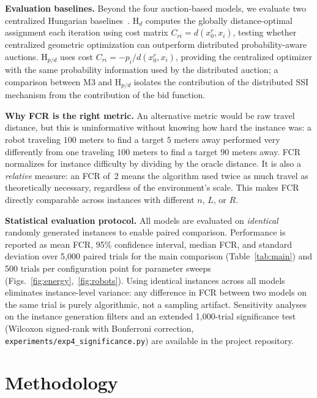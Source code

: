 \documentclass[conference]{IEEEtran}
\begin{document}
\textbf{Evaluation baselines.}
Beyond the four auction-based models, we evaluate two centralized Hungarian
baselines~\cite{Kuhn1955}.
$\mathrm{H}_d$ computes the globally distance-optimal assignment each
iteration using cost matrix $C_{ri} = d(x_0^r, x_i)$, testing whether
centralized geometric optimization can outperform distributed
probability-aware auctions.
$\mathrm{H}_{p/d}$ uses cost $C_{ri} = -p_i/d(x_0^r, x_i)$, providing the
centralized optimizer with the same probability information used by the
distributed auction; a comparison between M3 and $\mathrm{H}_{p/d}$
isolates the contribution of the distributed SSI mechanism from the
contribution of the bid function.

\textbf{Why FCR is the right metric.}
An alternative metric would be raw travel distance, but this is
uninformative without knowing how hard the instance was: a robot traveling
$100$ meters to find a target $5$ meters away performed very differently
from one traveling $100$ meters to find a target $90$ meters away.
FCR normalizes for instance difficulty by dividing by the oracle distance.
It is also a \emph{relative} measure: an FCR of~2 means the algorithm used
twice as much travel as theoretically necessary, regardless of the
environment's scale.
This makes FCR directly comparable across instances with different $n$,
$L$, or $R$.

\textbf{Statistical evaluation protocol.}
All models are evaluated on \emph{identical} randomly generated instances to
enable paired comparison.
Performance is reported as mean FCR, 95\% confidence interval, median FCR,
and standard deviation over 5,000 paired trials for the main comparison
(Table~\ref{tab:main}) and 500 trials per configuration point for parameter
sweeps (Figs.~\ref{fig:energy},~\ref{fig:robots}).
Using identical instances across all models eliminates instance-level
variance: any difference in FCR between two models on the same trial is
purely algorithmic, not a sampling artifact.
Sensitivity analyses on the instance generation filters and an extended
1,000-trial significance test (Wilcoxon signed-rank with Bonferroni
correction, \texttt{experiments/exp4\_significance.py}) are available in
the project repository.

\section{Methodology}\label{sec:methodology}
\end{document}
